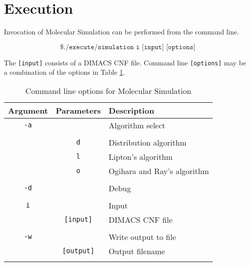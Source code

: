 \FloatBarrier
			
\section{Execution}
	
Invocation of Molecular Simulation can be performed from the command line.

\[
\texttt{\$ ./execute/simulation i [input] [options]}
\]

The \texttt{[input]} consists of a DIMACS CNF file.  Command line \texttt{[options]} may be a combination of the options in Table \ref{MolecularCommandLineArgs}.

\begin{table}[htdp]
\caption{Command line options for Molecular Simulation}
\begin{center}
\begin{tabular}{|c|c|l|}
\hline
\textbf{Argument} & \textbf{Parameters} & \textbf{Description} \\ \hline
 \texttt{-a}	& 				   & Algorithm select \\
  				&				   &		 \\
 				& \texttt{d}	   & Distribution algorithm		 \\
 				& \texttt{l}	   & Lipton's algorithm		 \\
 				& \texttt{o}	   & Ogihara and Ray's algorithm		 \\
 				&				   &		 \\ \hline 				
\texttt{-d}		&				   & Debug		 \\ 				
 				&				   &		 \\ \hline
\texttt{i}		&				   & Input		 \\ 				
				& \texttt{[input]} & DIMACS CNF file		 \\ 				
 				&				   &		 \\ \hline 				
\texttt{-w}		&				   & Write output to file		 \\
 				& \texttt{[output]} & Output filename \\
 				&				   &		 \\ \hline 				
\end{tabular}
\end{center}
\label{MolecularCommandLineArgs}
\end{table}%


